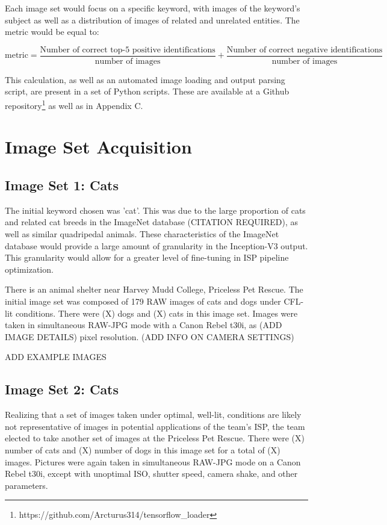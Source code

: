 \documentclass{report}
\begin{document}
		Each image set would focus on a specific keyword, with images of the keyword's subject as well as a distribution of images of related and unrelated entities. The metric would be equal to:
		
		\begin{equation*}
			\text{metric}=\frac{\text{Number of correct top-5 positive identifications}}{\text{number of images}} + \frac{\text{Number of correct negative identifications}}{\text{number of images}}
		\end{equation*}
		
		This calculation, as well as an automated image loading and output parsing script, are present in a set of Python scripts. These are available at a Github repository\footnote{https://github.com/Arcturus314/tensorflow\_loader} as well as in Appendix C.
	\section{Image Set Acquisition}
		\subsection{Image Set 1: Cats}
		The initial keyword chosen was 'cat'. This was due to the large proportion of cats and related cat breeds in the ImageNet database (CITATION REQUIRED), as well as similar quadripedal animals. These characteristics of the ImageNet database would provide a large amount of granularity in the Inception-V3 output. This granularity would allow for a greater level of fine-tuning in ISP pipeline optimization.
		
		There is an animal shelter near Harvey Mudd College, Priceless Pet Rescue\cite{http://pricelesspetrescue.org/}. The initial image set was composed of 179 RAW images of cats and dogs under CFL-lit conditions. There were (X) dogs and (X) cats in this image set. Images were taken in simultaneous RAW-JPG mode with a Canon Rebel t30i, as (ADD IMAGE DETAILS) pixel resolution. (ADD INFO ON CAMERA SETTINGS)
		
		ADD EXAMPLE IMAGES
		\subsection{Image Set 2: Cats}
		Realizing that a set of images taken under optimal, well-lit, conditions are likely not representative of images in potential applications of the team's ISP, the team elected to take another set of images at the Priceless Pet Rescue. There were (X) number of cats and (X) number of dogs in this image set for a total of (X) images. Pictures were again taken in simultaneous RAW-JPG mode on a Canon Rebel t30i, except with unoptimal ISO, shutter speed, camera shake, and other parameters.
		
\end{document}
